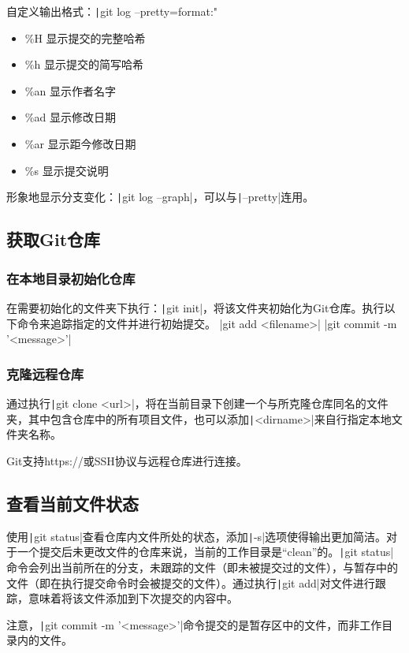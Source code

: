 \documentclass[fontset=ubuntu]{ctexart}
\begin{document}
自定义输出格式：\texttt|git log --pretty=format:"%
\begin{itemize}
\item \%H 显示提交的完整哈希
\item \%h 显示提交的简写哈希
\item  \%an 显示作者名字
\item  \%ad 显示修改日期 
\item  \%ar 显示距今修改日期 
\item  \%s 显示提交说明 
\end{itemize}

形象地显示分支变化：\texttt|git log --graph|，可以与\texttt|--pretty|连用。

\subsection{获取Git仓库}
\subsubsection{在本地目录初始化仓库}
在需要初始化的文件夹下执行：\texttt|git init|，将该文件夹初始化为Git仓库。执行以下命令来追踪指定的文件并进行初始提交。
|git add <filename>|
|git commit -m '<message>'|

\subsubsection{克隆远程仓库}
通过执行\texttt|git clone <url>|，将在当前目录下创建一个与所克隆仓库同名的文件夹，其中包含仓库中的所有项目文件，也可以添加\texttt|<dirname>|来自行指定本地文件夹名称。

Git支持https://或SSH协议与远程仓库进行连接。

\subsection{查看当前文件状态}
使用\texttt|git status|查看仓库内文件所处的状态，添加\texttt|-s|选项使得输出更加简洁。对于一个提交后未更改文件的仓库来说，当前的工作目录是“clean”的。\texttt|git status|命令会列出当前所在的分支，未跟踪的文件（即未被提交过的文件），与暂存中的文件（即在执行提交命令时会被提交的文件）。通过执行\texttt|git add|对文件进行跟踪，意味着将该文件添加到下次提交的内容中。

注意，\texttt|git commit -m '<message>'|命令提交的是暂存区中的文件，而非工作目录内的文件。
\end{document}
